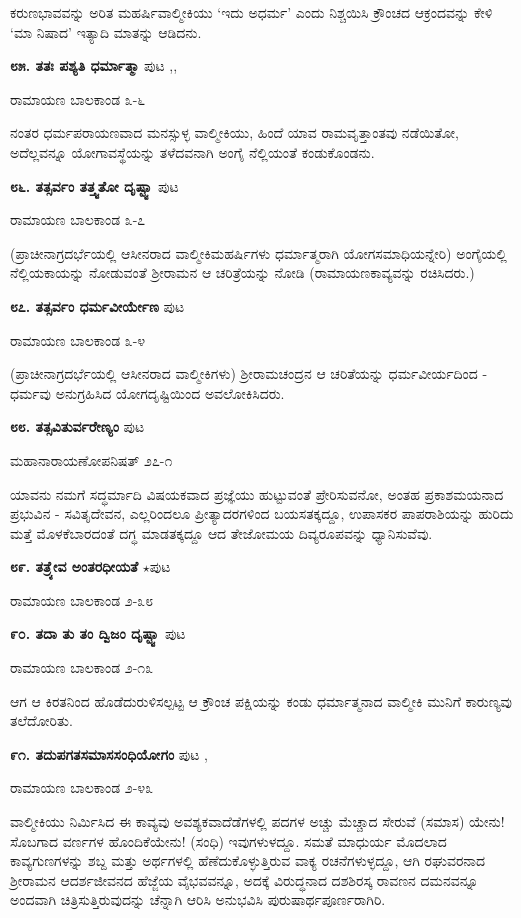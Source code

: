 ಕರುಣಭಾವವನ್ನು ಅರಿತ ಮಹರ್ಷಿವಾಲ್ಮೀಕಿಯು `ಇದು ಅಧರ್ಮ' ಎಂದು ನಿಶ್ಚಯಿಸಿ ಕ್ರೌಂಚದ ಆಕ್ರಂದವನ್ನು ಕೇಳಿ `ಮಾ ನಿಷಾದ' ಇತ್ಯಾದಿ ಮಾತನ್ನು ಆಡಿದನು.

\medskip
\noindent\textbf{೮೫. ತತಃ ಪಶ್ಯತಿ ಧರ್ಮಾತ್ಮಾ} \hfill ಪುಟ \pageref{204},\pageref{210a},\pageref{248}

\hfill ರಾಮಾಯಣ ಬಾಲಕಾಂಡ ೩-೬

ನಂತರ ಧರ್ಮಪರಾಯಣವಾದ ಮನಸ್ಸುಳ್ಳ ವಾಲ್ಮೀಕಿಯು, ಹಿಂದೆ ಯಾವ ರಾಮವೃತ್ತಾಂತವು ನಡೆಯಿತೋ, ಅದೆಲ್ಲವನ್ನೂ ಯೋಗಾವಸ್ಥೆಯನ್ನು ತಳೆದವನಾಗಿ ಅಂಗೈ ನೆಲ್ಲಿಯಂತೆ ಕಂಡುಕೊಂಡನು.

\medskip
\noindent\textbf{೮೬. ತತ್ಸರ್ವಂ ತತ್ತ್ವತೋ ದೃಷ್ಟ್ವಾ} \hfill ಪುಟ \pageref{149}

\hfill ರಾಮಾಯಣ ಬಾಲಕಾಂಡ ೩-೭

(ಪ್ರಾಚೀನಾಗ್ರದರ್ಭೆಯಲ್ಲಿ ಆಸೀನರಾದ ವಾಲ್ಮೀಕಿಮಹರ್ಷಿಗಳು ಧರ್ಮಾತ್ಮರಾಗಿ ಯೋಗಸಮಾಧಿಯನ್ನೇರಿ) ಅಂಗೈಯಲ್ಲಿ ನೆಲ್ಲಿಯಕಾಯನ್ನು ನೋಡುವಂತೆ ಶ್ರೀರಾಮನ ಆ ಚರಿತ್ರೆಯನ್ನು ನೋಡಿ (ರಾಮಾಯಣಕಾವ್ಯವನ್ನು ರಚಿಸಿದರು.)

\medskip
\noindent\textbf{೮೭. ತತ್ಸರ್ವಂ ಧರ್ಮವೀರ್ಯೇಣ} \hfill ಪುಟ \pageref{210c}

\hfill ರಾಮಾಯಣ ಬಾಲಕಾಂಡ ೩-೪

(ಪ್ರಾಚೀನಾಗ್ರದರ್ಭೆಯಲ್ಲಿ ಆಸೀನರಾದ ವಾಲ್ಮೀಕಿಗಳು) ಶ್ರೀರಾಮಚಂದ್ರನ ಆ ಚರಿತೆಯನ್ನು ಧರ್ಮವೀರ್ಯದಿಂದ - ಧರ್ಮವು ಅನುಗ್ರಹಿಸಿದ ಯೋಗದೃಷ್ಟಿಯಿಂದ ಅವಲೋಕಿಸಿದರು.

\medskip
\noindent\textbf{೮೮. ತತ್ಸವಿತುರ್ವರೇಣ್ಯಂ} \hfill ಪುಟ \pageref{186}

\hfill ಮಹಾನಾರಾಯಣೋಪನಿಷತ್ ೨೭-೧

ಯಾವನು ನಮಗೆ ಸದ್ಧರ್ಮಾದಿ ವಿಷಯಕವಾದ ಪ್ರಜ್ಞೆಯು ಹುಟ್ಟುವಂತೆ ಪ್ರೇರಿಸುವನೋ, ಅಂತಹ ಪ್ರಕಾಶಮಯನಾದ ಪ್ರಭುವಿನ - ಸವಿತೃದೇವನ, ಎಲ್ಲರಿಂದಲೂ ಪ್ರೀತ್ಯಾದರಗಳಿಂದ ಬಯಸತಕ್ಕದ್ದೂ, ಉಪಾಸಕರ ಪಾಪರಾಶಿಯನ್ನು ಹುರಿದು ಮತ್ತೆ ಮೊಳಕೆಬಾರದಂತೆ ದಗ್ಧ ಮಾಡತಕ್ಕದ್ದೂ ಆದ ತೇಜೋಮಯ ದಿವ್ಯರೂಪವನ್ನು ಧ್ಯಾನಿಸುವೆವು.

\medskip
\noindent\textbf{೮೯. ತತ್ರ್ಯೇವ ಅಂತರಧೀಯತೆ} $\star$\hfill ಪುಟ \pageref{181a}

\hfill ರಾಮಾಯಣ ಬಾಲಕಾಂಡ ೨-೩೮

\medskip
\noindent\textbf{೯೦. ತದಾ ತು ತಂ ದ್ವಿಜಂ ದೃಷ್ಟ್ವಾ} \hfill ಪುಟ \pageref{199}

\hfill ರಾಮಾಯಣ ಬಾಲಕಾಂಡ ೨-೧೩

ಆಗ ಆ ಕಿರತನಿಂದ ಹೊಡೆದುರುಳಿಸಲ್ಪಟ್ಟ ಆ ಕ್ರೌಂಚ ಪಕ್ಷಿಯನ್ನು ಕಂಡು ಧರ್ಮಾತ್ಮನಾದ ವಾಲ್ಮೀಕಿ ಮುನಿಗೆ ಕಾರುಣ್ಯವು ತಲೆದೋರಿತು.

\medskip
\noindent\textbf{೯೧. ತದುಪಗತಸಮಾಸಸಂಧಿಯೋಗಂ} \hfill ಪುಟ \pageref{152a},\pageref{212}

\hfill ರಾಮಾಯಣ ಬಾಲಕಾಂಡ ೨-೪೩

ವಾಲ್ಮೀಕಿಯು ನಿರ್ಮಿಸಿದ ಈ ಕಾವ್ಯವು ಅವಶ್ಯಕವಾದೆಡೆಗಳಲ್ಲಿ ಪದಗಳ ಅಚ್ಚು ಮೆಚ್ಚಾದ ಸೇರುವೆ (ಸಮಾಸ) ಯೇನು! ಸೊಬಗಾದ ವರ್ಣಗಳ ಹೊಂದಿಕೆಯೇನು! (ಸಂಧಿ) ಇವುಗಳುಳದ್ದೂ.  ಸಮತೆ ಮಾಧುರ್ಯ ಮೊದಲಾದ ಕಾವ್ಯಗುಣಗಳನ್ನು ಶಬ್ದ ಮತ್ತು ಅರ್ಥಗಳಲ್ಲಿ ಹೆಣೆದುಕೊಳ್ಳುತ್ತಿರುವ ವಾಕ್ಯ ರಚನೆಗಳುಳ್ಳದ್ದೂ, ಆಗಿ ರಘುವರನಾದ ಶ್ರೀರಾಮನ ಆದರ್ಶಜೀವನದ ಹೆಜ್ಜೆಯ ವೈಭವವನ್ನೂ, ಅದಕ್ಕೆ ವಿರುದ್ಧನಾದ ದಶಶಿರಸ್ಕ ರಾವಣನ ದಮನವನ್ನೂ ಅಂದವಾಗಿ ಚಿತ್ರಿಸುತ್ತಿರುವುದನ್ನು ಚೆನ್ನಾಗಿ ಆರಿಸಿ ಅನುಭವಿಸಿ ಪುರುಷಾರ್ಥಪೂರ್ಣರಾಗಿರಿ.

